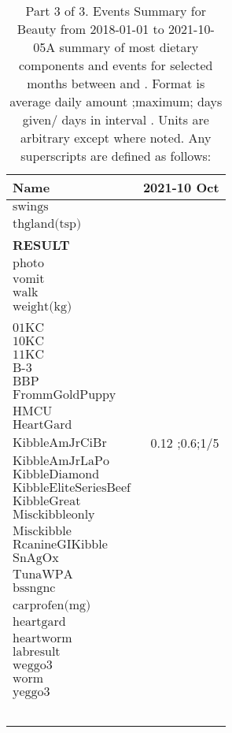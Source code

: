 \begin{table}[H]
\centering
\begin{tabular}{|l|r|}
\hline
Name&2021-10 Oct\\
\hline
$\textrm{swings}$&\\
$\textrm{thgland(tsp)}$&\\
{\bf RESULT}&\\
$\textrm{photo}$&\\
$\textrm{vomit}$&\\
$\textrm{walk}$&\\
$\textrm{weight(kg)}$&\\
&\\
$\textrm{01KC}$&\\
$\textrm{10KC}$&\\
$\textrm{11KC}$&\\
$\textrm{B-3}$&\\
$\textrm{BBP}$&\\
$\textrm{FrommGoldPuppy}$&\\
$\textrm{HMCU}$&\\
$\textrm{HeartGard}$&\\
$\textrm{KibbleAmJrCiBr}$&0.12 ;0.6;1/5\\
$\textrm{KibbleAmJrLaPo}$&\\
$\textrm{KibbleDiamond}$&\\
$\textrm{KibbleEliteSeriesBeef}$&\\
$\textrm{KibbleGreat}$&\\
$\textrm{Misckibbleonly}$&\\
$\textrm{Misckibble}$&\\
$\textrm{RcanineGIKibble}$&\\
$\textrm{SnAgOx}$&\\
$\textrm{TunaWPA}$&\\
$\textrm{bssngnc}$&\\
$\textrm{carprofen(mg)}$&\\
$\textrm{heartgard}$&\\
$\textrm{heartworm}$&\\
$\textrm{labresult}$&\\
$\textrm{weggo3}$&\\
$\textrm{worm}$&\\
$\textrm{yeggo3}$&\\
&\\
&\\
&\\
&\\
&\\
\hline
\end{tabular}
\caption{Part 3 of 3.  Events Summary for Beauty   from 2018-01-01 to 2021-10-05A summary of most dietary components and events  for selected months between \mjmdatemin and \mjmdatemax. Format is average daily amount ;maximum; days given/ days in interval . Units are arbitrary except where noted. Any  superscripts are defined as follows:  \mjmsuperscripts}
\end{table}
